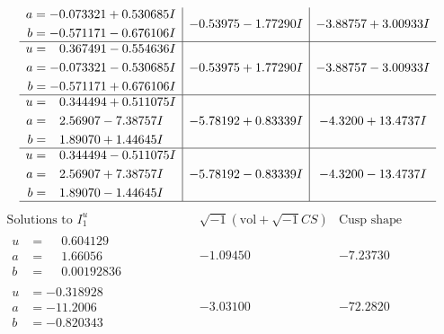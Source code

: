 \documentclass[1p]{elsarticle_modified}
\theoremstyle{definition}
\newcommand{\I}{\sqrt{-1}}
\begin{document}
$$\begin{array}{c|c|c}
\begin{aligned}
a &= -0.073321 + 0.530685 I \\
b &= -0.571171 - 0.676106 I\end{aligned}
 & -0.53975 - 1.77290 I & -3.88757 + 3.00933 I \\ \hline\begin{aligned}
u &= \phantom{-}0.367491 - 0.554636 I \\
a &= -0.073321 - 0.530685 I \\
b &= -0.571171 + 0.676106 I\end{aligned}
 & -0.53975 + 1.77290 I & -3.88757 - 3.00933 I \\ \hline\begin{aligned}
u &= \phantom{-}0.344494 + 0.511075 I \\
a &= \phantom{-}2.56907 - 7.38757 I \\
b &= \phantom{-}1.89070 + 1.44645 I\end{aligned}
 & -5.78192 + 0.83339 I & -4.3200 + 13.4737 I \\ \hline\begin{aligned}
u &= \phantom{-}0.344494 - 0.511075 I \\
a &= \phantom{-}2.56907 + 7.38757 I \\
b &= \phantom{-}1.89070 - 1.44645 I\end{aligned}
 & -5.78192 - 0.83339 I & -4.3200 - 13.4737 I\\
 \hline 
 \end{array}$$\newpage$$\begin{array}{c|c|c}  
\text{Solutions to }I^u_{1}& \I (\text{vol} + \sqrt{-1}CS) & \text{Cusp shape}\\
 \hline 
\begin{aligned}
u &= \phantom{-}0.604129\phantom{ +0.000000I} \\
a &= \phantom{-}1.66056\phantom{ +0.000000I} \\
b &= \phantom{-}0.00192836\phantom{ +0.000000I}\end{aligned}
 & -1.09450\phantom{ +0.000000I} & -7.23730\phantom{ +0.000000I} \\ \hline\begin{aligned}
u &= -0.318928\phantom{ +0.000000I} \\
a &= -11.2006\phantom{ +0.000000I} \\
b &= -0.820343\phantom{ +0.000000I}\end{aligned}
 & -3.03100\phantom{ +0.000000I} & -72.2820\phantom{ +0.000000I} \\ \hline\begin{aligned}

\end{aligned}
\end{array}$$
\end{document}
